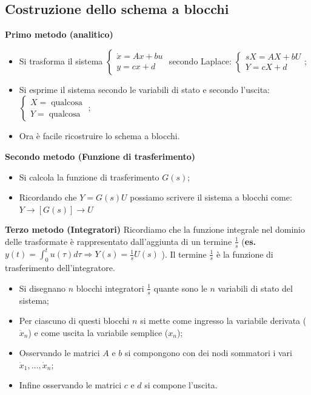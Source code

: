     \subsection{Costruzione dello schema a blocchi}
    \textbf{Primo metodo (analitico)}
    \begin{itemize}
        \item Si trasforma il sistema $\begin{cases}
            \dot{x} = A x + bu\\ y = cx +d
        \end{cases}$ secondo Laplace: $\begin{cases}
            s X = A X + b U\\ Y = c X + d
        \end{cases}$;
        \item Si esprime il sistema secondo le variabili di stato e secondo l'uscita:$\begin{cases}
            X = \;\text{qualcosa}\;\\ Y = \;\text{qualcosa}\;
        \end{cases}$;
        \item Ora è facile ricostruire lo schema a blocchi.
    \end{itemize}
    \textbf{Secondo metodo (Funzione di trasferimento)}
    \begin{itemize}
        \item Si calcola la funzione di trasferimento $G(s)$;
        \item Ricordando che $Y = G(s) U$ possiamo scrivere il sistema a blocchi come: $Y \longrightarrow \left[G(s)\right] \longrightarrow U$
    \end{itemize}
    \textbf{Terzo metodo (Integratori)}\newline
    Ricordiamo che la funzione integrale nel dominio delle trasformate è rappresentato dall'aggiunta di un termine $\frac{1}{s}$ (\textbf{es.} $y(t) = \int_{0}^{t}u(\tau)d \tau \Rightarrow Y(s) = \frac{1}{s} U(s)$ ).\newline
    Il termine $\frac{1}{s}$ è la funzione di trasferimento dell'integratore.
    \begin{itemize}
        \item Si disegnano $n$ blocchi integratori $\frac{1}{s}$ quante sono le $n$ variabili di stato del sistema;
        \item Per ciascuno di questi blocchi $n$ si mette come ingresso la variabile derivata ($\dot{x}_n$) e come uscita la variabile semplice ($x_n$);
        \item Osservando le matrici $A$ e $b$ si compongono con dei nodi sommatori i vari $\dot{x}_1, \dots, \dot{x}_n$;
        \item Infine osservando le matrici $c$ e $d$ si compone l'uscita.
    \end{itemize}

